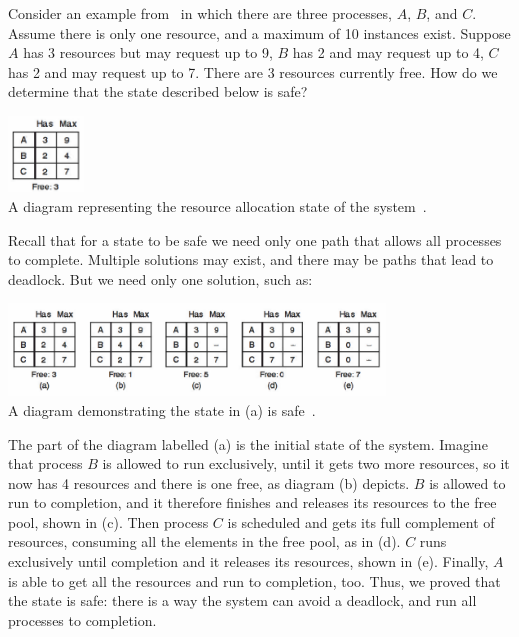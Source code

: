 Consider an example from~\cite{mos} in which there are three processes, $A$, $B$, and $C$. Assume there is only one resource, and a maximum of 10 instances exist. Suppose $A$ has 3 resources but may request up to 9, $B$ has 2 and may request up to 4, $C$ has 2 and may request up to 7. There are 3 resources currently free. How do we determine that the state described below is safe?

\begin{center}
	\includegraphics[width=0.15\textwidth]{images/safe-state-initial.png}\\
	A diagram representing the resource allocation state of the system~\cite{mos}.
\end{center}

Recall that for a state to be safe we need only one path that allows all processes to complete. Multiple solutions may exist, and there may be paths that lead to deadlock. But we need only one solution, such as:

\begin{center}
	\includegraphics[width=0.75\textwidth]{images/safe-state.png}\\
	A diagram demonstrating the state in (a) is safe~\cite{mos}.
\end{center}

The part of the diagram labelled (a) is the initial state of the system. Imagine that process $B$ is allowed to run exclusively, until it gets two more resources, so it now has 4 resources and there is one free, as diagram (b) depicts. $B$ is allowed to run to completion, and it therefore finishes and releases its resources to the free pool, shown in (c). Then process $C$ is scheduled and gets its full complement of resources, consuming all the elements in the free pool, as in (d). $C$ runs exclusively until completion and it releases its resources, shown in (e). Finally, $A$ is able to get all the resources and run to completion, too. Thus, we proved that the state is safe: there is a way the system can avoid a deadlock, and run all processes to completion.

